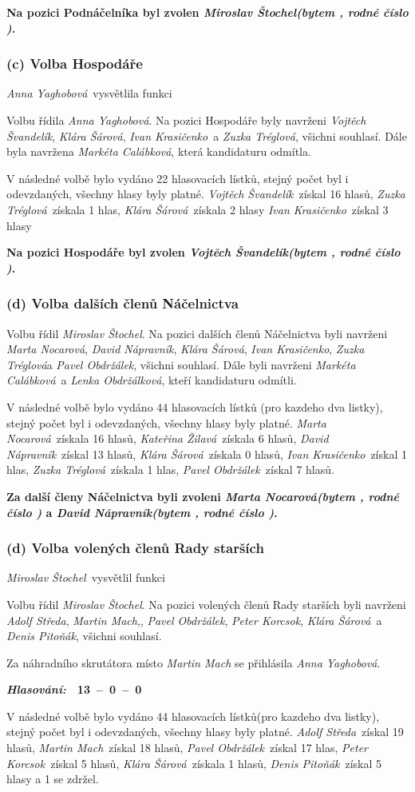 \documentclass[10pt,a4paper]{report}
\newcommand{\hlas}[3]{
  \begin{flushright}
  {\it\bfseries Hlasování:\/}\ \ {\bfseries #1\ --\ #2\ --\ #3}
  \end{flushright}
}
\newcommand{\pauza}{\vskip 5mm\relax}
\newcommand{\usn}[1]{
  \vskip 5mm\relax
  \noindent{\it\bfseries Usnesení:\/}\nopagebreak
  {\bf #1}
}
\newcommand{\AS}{{\it Adolf Středa\/}}
\newcommand{\AY}{{\it Anna Yaghobová\/}}
\newcommand{\DN}{{\it David Nápravník\/}}
\newcommand{\DP}{{\it Denis Pitoňák\/}}
\newcommand{\IK}{{\it Ivan Krasičenko\/}}
\newcommand{\KZ}{{\it Kateřina Žilavá\/}}
\newcommand{\KS}{{\it Klára Šárová\/}}
\newcommand{\LO}{{\it Lenka Obdržálková\/}}
\newcommand{\MC}{{\it Markéta Calábková\/}}
\newcommand{\MM}{{\it Martin Mach\/}}
\newcommand{\MN}{{\it Marta Nocarová\/}}
\newcommand{\MS}{{\it Miroslav Štochel\/}}
\newcommand{\PO}{{\it Pavel Obdržálek\/}}
\newcommand{\PK}{{\it Peter Korcsok\/}}
\newcommand{\VS}{{\it Vojtěch Švandelík\/}}
\newcommand{\ZT}{{\it Zuzka Tréglová\/}}
\begin{document}
\usn{Na pozici Podnáčelníka byl zvolen
  \MS {\it (bytem \censor{}, rodné číslo \censor{})\/}.}

\subsubsection{(c) Volba Hospodáře}
\AY\ vysvětlila funkci
\pauza

Volbu řídila \AY.
Na pozici Hospodáře byly navrženi \VS, \KS, \IK\ a \ZT, všichni souhlasí.
Dále byla navržena \MC, která kandidaturu odmítla.

V následné volbě bylo vydáno 22 hlasovacích lístků,
stejný počet byl i odevzdaných, všechny hlasy byly platné.
  \VS\ získal 16 hlasů,
  \ZT\ získala 1 hlas,
  \KS\ získala 2 hlasy
  \IK\ získal 3 hlasy
\pauza

\usn{Na pozici Hospodáře byl zvolen
  \VS {\it (bytem \censor{}, rodné číslo \censor{})\/}.}

\subsubsection{(d) Volba dalších členů Náčelnictva}
Volbu řídil \MS.
Na pozici dalších členů Náčelnictva byli navrženi \MN, \DN, \KS, \IK, \ZT a \PO, všichni souhlasí.
Dále byli navrženi \MC\ a \LO, kteří kandidaturu odmítli.
\pauza

V následné volbě bylo vydáno 44 hlasovacích lístků (pro kazdeho dva listky),
stejný počet byl i odevzdaných, všechny hlasy byly platné.
  \MN\ získala 16 hlasů,
  \KZ\ získala 6 hlasů,
  \DN\ získal 13 hlasů,
  \KS\ získala 0 hlasů,
  \IK\ získal 1 hlas,
  \ZT\ získala 1 hlas,
  \PO\ získal 7 hlasů.
\pauza

\usn{Za další členy Náčelnictva byli zvoleni
  \MN {\it (bytem \censor{}, rodné číslo \censor{})\/} a
  \DN {\it (bytem \censor{}, rodné číslo \censor{})\/}.
}

\subsubsection{(d) Volba volených členů Rady starších}
\MS\ vysvětlil funkci
\pauza

Volbu řídil \MS.
Na pozici volených členů Rady starších byli navrženi \AS, \MM,, \PO, \PK, \KS\ a \DP, všichni souhlasí.
\pauza

Za náhradního skrutátora místo {\it \MM} se přihlásila \AY.
\hlas{13}{0}{0}
\pauza

V následné volbě bylo vydáno 44 hlasovacích lístků(pro kazdeho dva listky),
stejný počet byl i odevzdaných, všechny hlasy byly platné.
  \AS\ získal 19 hlasů,
  \MM\ získal 18 hlasů,
  \PO\ získal 17 hlas,
  \PK\ získal 5 hlasů,
  \KS\ získala 1 hlasů,
  \DP\ získal 5 hlasy a
  1 se zdržel.
  
\end{document}
